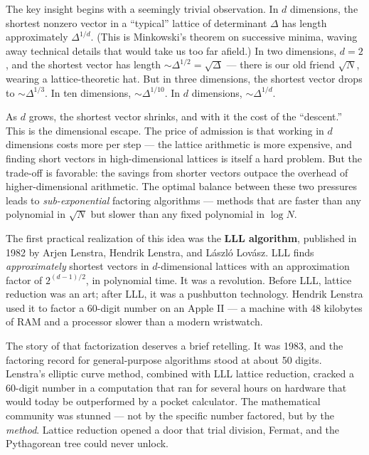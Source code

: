 The key insight begins with a seemingly trivial observation. In \(d\) dimensions, the shortest nonzero vector in a ``typical'' lattice of determinant \(\Delta\) has length approximately \(\Delta^{1/d}\). (This is Minkowski's theorem on successive minima, waving away technical details that would take us too far afield.) In two dimensions, \(d = 2\), and the shortest vector has length \(\sim \Delta^{1/2} = \sqrt{\Delta}\) --- there is our old friend \(\sqrt{N}\), wearing a lattice-theoretic hat. But in three dimensions, the shortest vector drops to \(\sim \Delta^{1/3}\). In ten dimensions, \(\sim \Delta^{1/10}\). In \(d\) dimensions, \(\sim \Delta^{1/d}\).

As \(d\) grows, the shortest vector shrinks, and with it the cost of the ``descent.'' This is the dimensional escape. The price of admission is that working in \(d\) dimensions costs more per step --- the lattice arithmetic is more expensive, and finding short vectors in high-dimensional lattices is itself a hard problem. But the trade-off is favorable: the savings from shorter vectors outpace the overhead of higher-dimensional arithmetic. The optimal balance between these two pressures leads to \emph{sub-exponential} factoring algorithms --- methods that are faster than any polynomial in \(\sqrt{N}\) but slower than any fixed polynomial in \(\log N\).

The first practical realization of this idea was the \textbf{LLL algorithm}, published in 1982 by Arjen Lenstra, Hendrik Lenstra, and László Lovász. LLL finds \emph{approximately} shortest vectors in \(d\)-dimensional lattices with an approximation factor of \(2^{(d-1)/2}\), in polynomial time. It was a revolution. Before LLL, lattice reduction was an art; after LLL, it was a pushbutton technology. Hendrik Lenstra used it to factor a 60-digit number on an Apple II --- a machine with 48 kilobytes of RAM and a processor slower than a modern wristwatch.

The story of that factorization deserves a brief retelling. It was 1983, and the factoring record for general-purpose algorithms stood at about 50 digits. Lenstra's elliptic curve method, combined with LLL lattice reduction, cracked a 60-digit number in a computation that ran for several hours on hardware that would today be outperformed by a pocket calculator. The mathematical community was stunned --- not by the specific number factored, but by the \emph{method}. Lattice reduction opened a door that trial division, Fermat, and the Pythagorean tree could never unlock.


